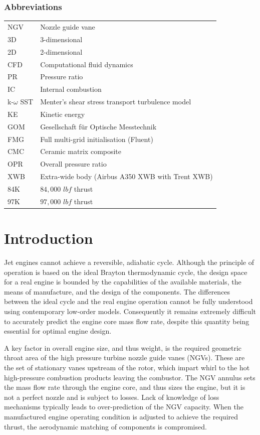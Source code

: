 \documentclass[a4paper, 11pt, oneside]{report}
\begin{document}
\subsection*{Abbreviations}
\begin{table}[H]
\begin{center}
\begin{tabular}{ll}
NGV & Nozzle guide vane \\
3D & 3-dimensional \\
2D & 2-dimensional \\
CFD & Computational fluid dynamics \\
PR & Pressure ratio \\
IC & Internal combustion \\
k-$\omega$ SST & Menter's shear stress transport turbulence model \\
KE & Kinetic energy \\
GOM & Gesellschaft f\"ur Optische Messtechnik \\
FMG & Full multi-grid initialisation (Fluent) \\
CMC & Ceramic matrix composite \\
OPR & Overall pressure ratio \\
XWB & Extra-wide body (Airbus A350 XWB with Trent XWB) \\
84K & $84,000$ $lbf$ thrust \\
97K & $97,000$ $lbf$ thrust
\end{tabular}
\end{center}
\end{table}



\chapter{Introduction}
\label{chapter_introduction}

Jet engines cannot achieve a reversible, adiabatic cycle. Although the principle of operation is based on the ideal Brayton thermodynamic cycle, the design space for a real engine is bounded by the capabilities of the available materials, the means of manufacture, and the design of the components. The differences between the ideal cycle and the real engine operation cannot be fully understood using contemporary low-order models. Consequently it remains extremely difficult to accurately predict the engine core mass flow rate, despite this quantity being essential for optimal engine design.

A key factor in overall engine size, and thus weight, is the required geometric throat area of the high pressure turbine nozzle guide vanes (NGVs). These are the set of stationary vanes upstream of the rotor, which impart whirl to the hot high-pressure combustion products leaving the combustor. The NGV annulus sets the mass flow rate through the engine core, and thus sizes the engine, but it is not a perfect nozzle and is subject to losses. Lack of knowledge of loss mechanisms typically leads to over-prediction of the NGV capacity. When the manufactured engine operating condition is adjusted to achieve the required thrust, the aerodynamic matching of components is compromised.
\end{document}
